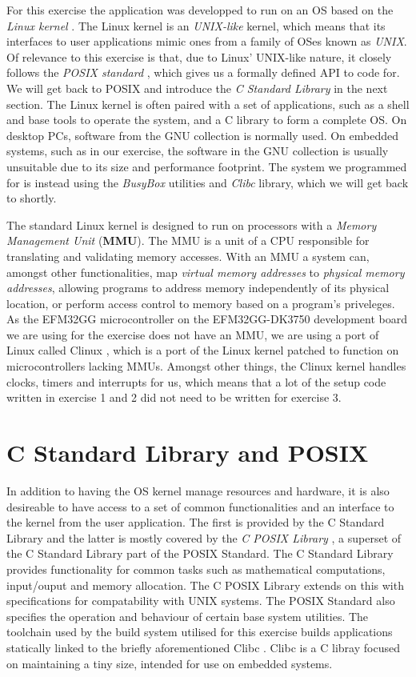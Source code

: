For this exercise the application was developped to run on an OS based on the
\emph{Linux kernel} \cite{TDT4528Compendium}. The Linux kernel is an
\emph{UNIX-like} kernel, which means that its interfaces to user applications
mimic ones from a family of OSes known as \emph{UNIX}. Of relevance to this
exercise is that, due to Linux' UNIX-like nature, it closely follows the
\emph{POSIX standard} \cite{posix}, which gives us a formally defined API to
code for. We will get back to POSIX and introduce the \emph{C Standard Library}
in the next section.  The Linux kernel is often paired with a set of
applications, such as a shell and base tools to operate the system, and a C
library to form a complete OS. On desktop PCs, software from the GNU collection
is normally used. On embedded systems, such as in our exercise, the software in
the GNU collection is usually unsuitable due to its size and performance
footprint. The system we programmed for is instead using the \emph{BusyBox}
utilities \cite{busy} and \emph{\textmu Clibc} \cite{ulibc} library, which we
will get back to shortly.

The standard Linux kernel is designed to run on processors with a \emph{Memory
Management Unit} (\textbf{MMU}). The MMU is a unit of a CPU responsible for
translating and validating memory accesses. With an MMU a system can, amongst
other functionalities, map \emph{virtual memory addresses} to \emph{physical
memory addresses}, allowing programs to address memory independently of its
physical location, or perform access control to memory based on a program's
priveleges. As the EFM32GG microcontroller on the EFM32GG-DK3750 development
board we are using for the exercise does not have an MMU, we are using a port of
Linux called \textmu Clinux \cite{ulinux}, which is a port of the Linux kernel
patched to function on microcontrollers lacking MMUs. Amongst other things, the
\textmu Clinux kernel handles clocks, timers and interrupts for us, which means
that a lot of the setup code written in exercise 1 and 2 did not need to be
written for exercise 3.

\section{C Standard Library and POSIX}

In addition to having the OS kernel manage resources and hardware, it is also
desireable to have access to a set of common functionalities and an interface to
the kernel from the user application. The first is provided by the C Standard
Library and the latter is mostly covered by the \emph{C POSIX Library}
\cite{posix}, a superset of the C Standard Library part of the POSIX Standard.
The C Standard Library provides functionality for common tasks such as
mathematical computations, input/ouput and memory allocation. The C POSIX
Library extends on this with specifications for compatability with UNIX systems.
The POSIX Standard also specifies the operation and behaviour of certain base
system utilities. The toolchain used by the build system utilised for this
exercise builds applications statically linked to the briefly aforementioned
\textmu Clibc \cite{ulibc}. \textmu Clibc is a C libray focused on maintaining a
tiny size, intended for use on embedded systems.

